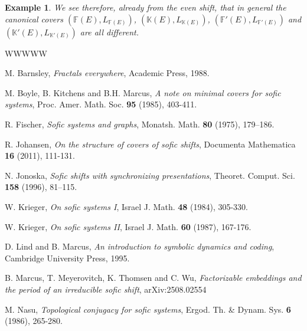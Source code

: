 \documentclass[12pt,oneside,english]{amsart}
\newtheorem{example}[thm]{Example}
\newenvironment{ex}{\begin{example}\rm}{\end{example}}
\begin{document}
\begin{ex}
We see therefore, already from the even shift, that in general the canonical covers $(\mathbb F(E),L_{\mathbb F(E)})$, $(\mathbb K(E),L_{\mathbb K(E)})$, $(\mathbb F'(E),L_{\mathbb F'(E)})$ and $(\mathbb K'(E),L_{\mathbb K'(E)})$ are all different.
\end{ex}




\begin{thebibliography}{WWWWW} %



 M. Barnsley, {\em Fractals everywhere}, Academic Press, 1988.

 M. Boyle, B. Kitchens and B.H. Marcus, {\em A note on minimal covers for sofic systems}, Proc. Amer. Math. Soc. {\bf 95} (1985), 403-411.


 R. Fischer, {\em Sofic systems and graphs}, Monatsh. Math. {\bf 80} (1975), 179--186.


 R. Johansen, {\em On the structure of covers of sofic shifts}, Documenta Mathematica {\bf 16} (2011), 111-131. 

 N. Jonoska, {\em Sofic shifts with synchronizing presentations}, Theoret. Comput. Sci. {\bf 158} (1996), 81--115.






 W. Krieger, {\em On sofic systems I}, Israel J. Math. {\bf 48} (1984), 305-330.

 W. Krieger, {\em On sofic systems II}, Israel J. Math. {\bf 60} (1987), 167-176.


 D. Lind and B. Marcus, {\em An introduction to symbolic dynamics and coding}, Cambridge University Press, 1995.




 B. Marcus, T. Meyerovitch, K. Thomsen and C. Wu, {\em
Factorizable embeddings and the period of an irreducible sofic shift}, arXiv:2508.02554 


 M. Nasu, {\em Topological conjugacy for sofic systems}, Ergod. Th. \& Dynam. Sys. {\bf 6} (1986), 265-280.



\end{thebibliography}
\end{document}
